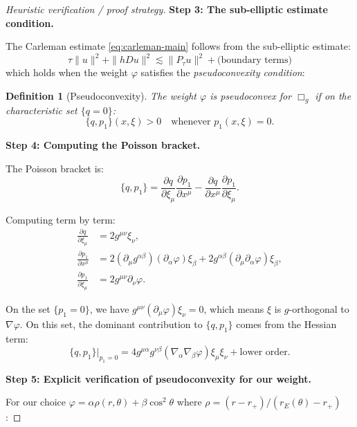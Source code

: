 \documentclass[12pt,a4paper]{article}
\newtheorem{definition}[theorem]{Definition}
\begin{document}
\begin{proof}[Heuristic verification / proof strategy]
\textbf{Step 3: The sub-elliptic estimate condition.}

The Carleman estimate \eqref{eq:carleman-main} follows from the sub-elliptic estimate:
\begin{equation}\label{eq:subelliptic}
\tau\|u\|^2 + \|hDu\|^2 \lesssim \|P_\tau u\|^2 + \text{(boundary terms)}
\end{equation}
which holds when the weight $\varphi$ satisfies the \textit{pseudoconvexity condition}:

\begin{definition}[Pseudoconvexity]
The weight $\varphi$ is pseudoconvex for $\Box_g$ if on the characteristic set $\{q = 0\}$:
\begin{equation}\label{eq:pseudoconvex}
\{q, p_1\}(x, \xi) > 0 \quad \text{whenever } p_1(x, \xi) = 0.
\end{equation}
\end{definition}

\textbf{Step 4: Computing the Poisson bracket.}

The Poisson bracket is:
\begin{equation}
\{q, p_1\} = \frac{\partial q}{\partial \xi_\mu}\frac{\partial p_1}{\partial x^\mu} - \frac{\partial q}{\partial x^\mu}\frac{\partial p_1}{\partial \xi_\mu}.
\end{equation}

Computing term by term:
\begin{align}
\frac{\partial q}{\partial \xi_\mu} &= 2g^{\mu\nu}\xi_\nu, \\
\frac{\partial p_1}{\partial x^\mu} &= 2(\partial_\mu g^{\alpha\beta})(\partial_\alpha\varphi)\xi_\beta + 2g^{\alpha\beta}(\partial_\mu\partial_\alpha\varphi)\xi_\beta, \\
\frac{\partial p_1}{\partial \xi_\mu} &= 2g^{\mu\nu}\partial_\nu\varphi.
\end{align}

On the set $\{p_1 = 0\}$, we have $g^{\mu\nu}(\partial_\mu\varphi)\xi_\nu = 0$, which means $\xi$ is $g$-orthogonal to $\nabla\varphi$. On this set, the dominant contribution to $\{q, p_1\}$ comes from the Hessian term:
\begin{equation}
\{q, p_1\}\big|_{p_1 = 0} = 4g^{\mu\alpha}g^{\nu\beta}(\nabla_\alpha\nabla_\beta\varphi)\xi_\mu\xi_\nu + \text{lower order}.
\end{equation}

\textbf{Step 5: Explicit verification of pseudoconvexity for our weight.}

For our choice $\varphi = \alpha\rho(r, \theta) + \beta\cos^2\theta$ where $\rho = (r-r_+)/(r_E(\theta) - r_+)$:


\end{proof}
\end{document}
